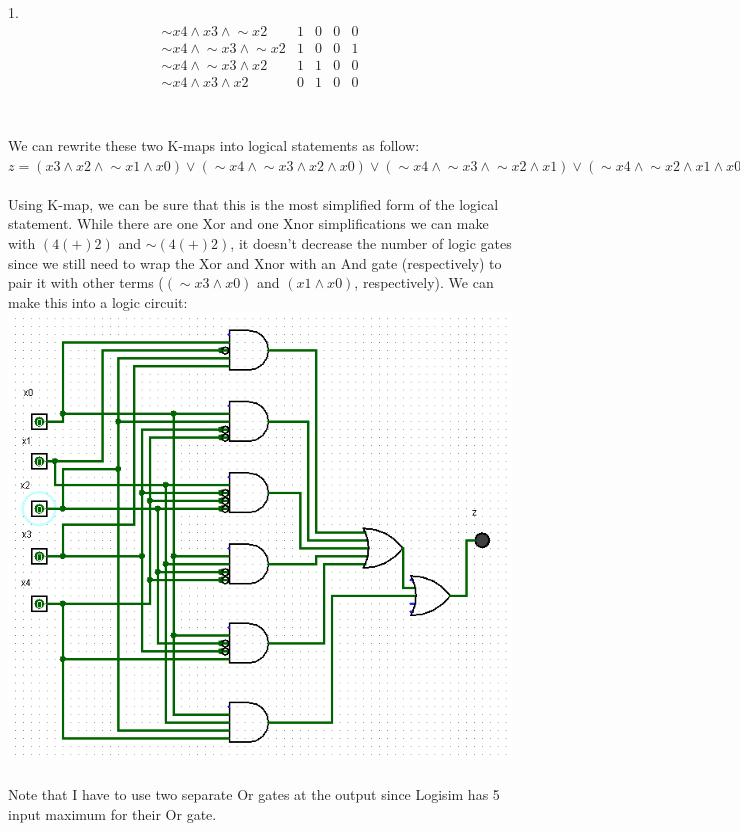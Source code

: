 \documentclass[a4paper, 20pt]{article}
\def\lnot{\mathop{\sim}}
\begin{document}
\begin{question}{1.}
\begin{displaymath}
\begin{array}{|c|c|c|c|c|}
\lnot x4 \land x3 \land \lnot x2 & 1&0&0&0\\
\lnot x4 \land \lnot x3 \land \lnot x2 & 1&0&0&1\\
\lnot x4 \land \lnot x3 \land x2 & 1&1&0&0\\
\lnot x4 \land x3 \land x2 & 0&1&0&0\\
\end{array}
\end{displaymath}
\\
\\ We can rewrite these two K-maps into logical statements as follow:
\\ $ z = (x3 \land x2 \land \lnot x1 \land x0) \lor (\lnot x4 \land \lnot x3 \land x2 \land x0) \lor (\lnot x4 \land \lnot x3 \land \lnot x2 \land x1) \lor (\lnot x4 \land \lnot x2 \land x1 \land x0) \lor (x4 \land \lnot x3 \land \lnot x2 \land x0) \lor (x4 \land x2 \land x1 \land x0) $
\\
\\ Using K-map, we can be sure that this is the most simplified form of the logical statement. While there are one Xor and one Xnor simplifications we can make with $(4(+)2)$ and $\lnot (4(+)2)$, it doesn't decrease the number of logic gates since we still need to wrap the Xor and Xnor with an And gate (respectively) to pair it with other terms ($(\lnot x3 \land x0)$ and $(x1 \land x0)$, respectively). We can make this into a logic circuit:
\\
\leavevmode{}\hbox{\includegraphics[scale=0.75]{4.PNG}}
\\
\\ Note that I have to use two separate Or gates at the output since Logisim has 5 input maximum for their Or gate.
\\
\\ 
\end{question}
\end{document}
